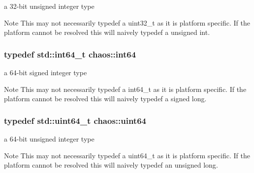 a 32-\/bit unsigned integer type 

\begin{DoxyNote}{Note}
This may not necessarily {\ttfamily typedef} a {\ttfamily uint32\+\_\+t} as it is platform specific. If the platform cannot be resolved this will naively {\ttfamily typedef} a {\ttfamily unsigned int}. 
\end{DoxyNote}
\hypertarget{namespacechaos_aa4cfe70894188e01134a2694db2eb2db}{}
\subsubsection[{int64}]{\setlength{\rightskip}{0pt plus 5cm}typedef std\+::int64\+\_\+t {\bf chaos\+::int64}}\label{namespacechaos_aa4cfe70894188e01134a2694db2eb2db}


a 64-\/bit signed integer type 

\begin{DoxyNote}{Note}
This may not necessarily {\ttfamily typedef} a {\ttfamily int64\+\_\+t} as it is platform specific. If the platform cannot be resolved this will naively {\ttfamily typedef} a {\ttfamily signed long}. 
\end{DoxyNote}
\hypertarget{namespacechaos_a9d62ad11fed4e3a5af70653b228ac910}{}
\subsubsection[{uint64}]{\setlength{\rightskip}{0pt plus 5cm}typedef std\+::uint64\+\_\+t {\bf chaos\+::uint64}}\label{namespacechaos_a9d62ad11fed4e3a5af70653b228ac910}


a 64-\/bit unsigned integer type 

\begin{DoxyNote}{Note}
This may not necessarily {\ttfamily typedef} a {\ttfamily uint64\+\_\+t} as it is platform specific. If the platform cannot be resolved this will naively {\ttfamily typedef} an {\ttfamily unsigned long}. 
\end{DoxyNote}
